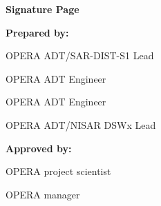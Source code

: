 \thispagestyle{plain}

\noindent\Large\textbf{Signature Page}

\vspace{1cm}

\noindent\large\textbf{Prepared by:}
\normalsize

\signature{Richard West}{OPERA ADT/SAR-DIST-S1 Lead}
\signature{Charles Marshak}{OPERA ADT Engineer}
\signature{Talib Oliver Cabrera}{OPERA ADT Engineer}
\signature{Jungkyo Jung}{OPERA ADT/NISAR DSWx Lead}

\vfill

\noindent\large\textbf{Approved by:}
\normalsize

\signature{Steven Chan}{OPERA project scientist}
\signature{David Bekaert}{OPERA manager}

\vfill

\thispagestyle{fancy}
